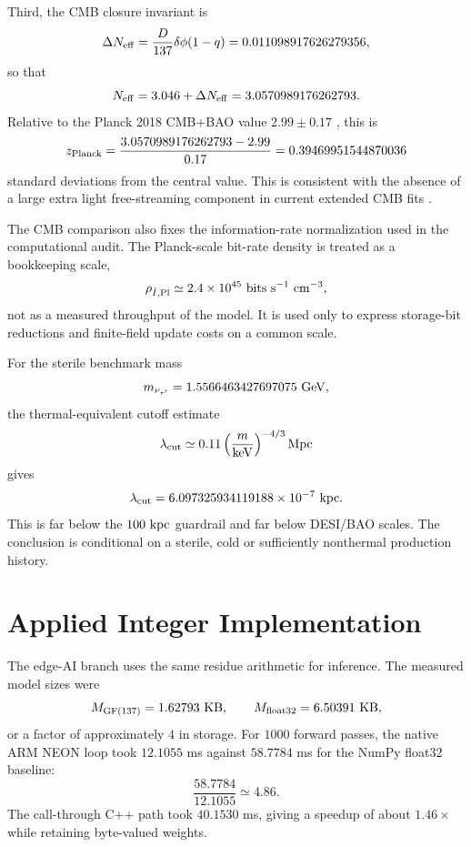 \documentclass[11pt]{article}
\begin{document}
Third, the CMB closure invariant is
\begin{equation}
    \Delta N_{\rm eff}
    =
    \frac{D}{137}\delta\phi(1-q)
    =
    0.011098917626279356,
\end{equation}
so that
\begin{equation}
    N_{\rm eff}=3.046+\Delta N_{\rm eff}
    =
    3.0570989176262793.
\end{equation}
Relative to the Planck 2018 CMB+BAO value
$2.99\pm0.17$ \cite{planck2018}, this is
\begin{equation}
    z_{\rm Planck}
    =
    \frac{3.0570989176262793-2.99}{0.17}
    =
    0.39469951544870036
\end{equation}
standard deviations from the central value.  This is consistent with the
absence of a large extra light free-streaming component in current extended
CMB fits \cite{actdr6extended}.

The CMB comparison also fixes the information-rate normalization used in the
computational audit.  The Planck-scale bit-rate density is treated as a
bookkeeping scale,
\begin{equation}
    \rho_{\dot I,{\rm Pl}}
    \simeq
    2.4\times10^{45}
    ~{\rm bits~s^{-1}~cm^{-3}},
\end{equation}
not as a measured throughput of the model.  It is used only to express
storage-bit reductions and finite-field update costs on a common scale.

For the sterile benchmark mass
\begin{equation}
    m_{\nu_{\tau'}}=1.5566463427697075~{\rm GeV},
\end{equation}
the thermal-equivalent cutoff estimate
\begin{equation}
    \lambda_{\rm cut}
    \simeq0.11\left(\frac{m}{\rm keV}\right)^{-4/3}{\rm Mpc}
\end{equation}
gives
\begin{equation}
    \lambda_{\rm cut}
    =
    6.097325934119188\times10^{-7}~{\rm kpc}.
\end{equation}
This is far below the $100~{\rm kpc}$ guardrail and far below DESI/BAO
scales.  The conclusion is conditional on a sterile, cold or sufficiently
nonthermal production history.

\section{Applied Integer Implementation}

The edge-AI branch uses the same residue arithmetic for inference.  The
measured model sizes were
\begin{equation}
    M_{\rm GF(137)}=1.62793~{\rm KB},
    \qquad
    M_{\rm float32}=6.50391~{\rm KB},
\end{equation}
or a factor of approximately $4$ in storage.  For $1000$ forward passes, the
native ARM NEON loop took $12.1055$ ms against $58.7784$ ms for the NumPy
float32 baseline:
\begin{equation}
    \frac{58.7784}{12.1055}\simeq4.86.
\end{equation}
The call-through C++ path took $40.1530$ ms, giving a speedup of about
$1.46\times$ while retaining byte-valued weights.
\end{document}

